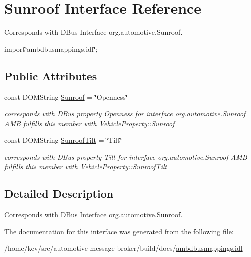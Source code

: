 \hypertarget{interfaceSunroof}{\section{Sunroof Interface Reference}
\label{interfaceSunroof}
}


Corresponds with D\+Bus Interface org.\+automotive.\+Sunroof.  




{\ttfamily import\char`\"{}ambdbusmappings.\+idl\char`\"{};}

\subsection*{Public Attributes}
\begin{DoxyCompactItemize}
\item 
\hypertarget{interfaceSunroof_af525e7e42bef949cdb38689a44872ebf}{const D\+O\+M\+String \hyperlink{interfaceSunroof_af525e7e42bef949cdb38689a44872ebf}{Sunroof} = \char`\"{}Openness\char`\"{}}\label{interfaceSunroof_af525e7e42bef949cdb38689a44872ebf}

\begin{DoxyCompactList}\small\item\em corresponds with D\+Bus property Openness for interface org.\+automotive.\+Sunroof A\+M\+B fulfills this member with Vehicle\+Property\+::\+Sunroof \end{DoxyCompactList}\item 
\hypertarget{interfaceSunroof_afe5bef43d2e75c081c1ccf4df291357a}{const D\+O\+M\+String \hyperlink{interfaceSunroof_afe5bef43d2e75c081c1ccf4df291357a}{Sunroof\+Tilt} = \char`\"{}Tilt\char`\"{}}\label{interfaceSunroof_afe5bef43d2e75c081c1ccf4df291357a}

\begin{DoxyCompactList}\small\item\em corresponds with D\+Bus property Tilt for interface org.\+automotive.\+Sunroof A\+M\+B fulfills this member with Vehicle\+Property\+::\+Sunroof\+Tilt \end{DoxyCompactList}\end{DoxyCompactItemize}


\subsection{Detailed Description}
Corresponds with D\+Bus Interface org.\+automotive.\+Sunroof. 

The documentation for this interface was generated from the following file\+:\begin{DoxyCompactItemize}
\item 
/home/kev/src/automotive-\/message-\/broker/build/docs/\hyperlink{ambdbusmappings_8idl}{ambdbusmappings.\+idl}\end{DoxyCompactItemize}
